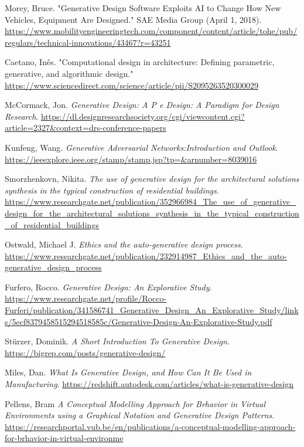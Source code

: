 \begin{thebibliography}{99}
    
     Morey, Bruce. "Generative Design Software Exploits AI to Change How New Vehicles, Equipment Are Designed." SAE Media Group (April 1, 2018). \url{https://www.mobilityengineeringtech.com/component/content/article/tohe/pub/regulars/technical-innovations/43467?r=43251}

      Caetano, Inês. "Computational design in architecture: Defining parametric, generative, and algorithmic design." \url{https://www.sciencedirect.com/science/article/pii/S2095263520300029}
        
     McCormack, Jon. \textit{Generative Design: A P e Design: A Paradigm for Design Research}. \url{https://dl.designresearchsociety.org/cgi/viewcontent.cgi?article=2327&context=drs-conference-papers}

     Kunfeng, Wang. \textit{Generative Adversarial Networks:Introduction and Outlook}. \url{https://ieeexplore.ieee.org/stamp/stamp.jsp?tp=&arnumber=8039016}

     Smorzhenkovn, Nikita. \textit{The use of generative design for the architectural solutions synthesis in the typical construction of residential buildings}. \url{https://www.researchgate.net/publication/352966984_The_use_of_generative_design_for_the_architectural_solutions_synthesis_in_the_typical_construction_of_residential_buildings}

     Ostwald, Michael J. \textit{Ethics and the auto-generative design process}. \url{https://www.researchgate.net/publication/232914987_Ethics_and_the_auto-generative_design_process}

     Furfero, Rocco. \textit{Generative Design: An Explorative Study}. \url{https://www.researchgate.net/profile/Rocco-Furferi/publication/341586741_Generative_Design_An_Explorative_Study/links/5ecf8379458515294518585c/Generative-Design-An-Explorative-Study.pdf}

     Stürzer, Dominik. \textit{A Short Introduction To Generative Design}. \url{https://bigrep.com/posts/generative-design/}

     Miles, Dan. \textit{What Is Generative Design, and How Can It Be Used in Manufacturing}. \url{https://redshift.autodesk.com/articles/what-is-generative-design}
    
     Pellens, Bram \textit{A Conceptual Modelling Approach for Brhavior in Virtual Environments using a Graphical Notation and Generative Design Patterns}. \url{https://researchportal.vub.be/en/publications/a-conceptual-modelling-approach-for-brhavior-in-virtual-environme}


\end{thebibliography}
